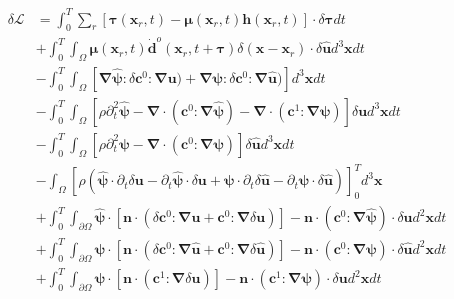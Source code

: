 \documentclass[extra,mreferee]{gji}
\newcommand{\bsy}[1]{\boldsymbol{{}#1}}
\begin{document}
\begin{equation}
	\begin{split}
		\delta\mathcal{L}
		&
		=\int^T_0\sum_{r}\left[\bsy{\tau}(\mathbf{x}_r,t)-\bsy{\mu}(\mathbf{x}_r,t)\mathbf{h}(\mathbf{x}_r,t)\right]\bsy{\cdot}\delta
		\bsy{\tau}dt \\
		& +\int^T_0\int_{\Omega}
		\bsy{\mu}(\mathbf{x}_r,t)\mathbf{\dot{d}}^o(\mathbf{x}_r,t+\bsy{\tau})\delta(\mathbf{x}-\mathbf{x}_r)\bsy{\cdot}\delta
		\mathbf{\hat{u}}d^3\mathbf{x}dt\\
		& -\int^T_0\int_{\Omega}\left[
		\bsy{\nabla\hat \psi:}\delta \bsy{\mathbf{c}}^0\bsy{:\nabla\mathbf{u}})
		+\bsy{\nabla\psi:}\delta \bsy{\mathbf{c}}^0\bsy{: \nabla\mathbf{\hat{u}}})\right]
		d^3\mathbf{x}dt\\
		& -\int^T_0\int_{\Omega} \left[\rho\partial^2_t \bsy{\hat \psi} -\bsy{\nabla
		\cdot}	(\bsy{\mathbf{c}}^0\bsy{:\nabla\bsy{\hat
		\psi}})-\bsy{\nabla\cdot}(\bsy{\mathbf{c}}^1\bsy{:\nabla\psi})
		\right]\delta\mathbf{u}d^3\mathbf{x}dt\\
	&-\int^T_0\int_{\Omega} \left[\rho\partial^2_t
	\bsy\psi-\bsy{\nabla\cdot}(\bsy{\mathbf{c}}^0\bsy{:\nabla\bsy\psi})\right]
	\delta\mathbf{\hat{u}}d^3\mathbf{x}dt\\
	&-\int_{\Omega} [\rho(\bsy{\hat \psi}
	\bsy{\cdot}\partial_t\delta\mathbf{u}-\partial_t\bsy{\hat \psi}\bsy{\cdot}\delta\mathbf{u}
	+\bsy{\psi}\bsy{\cdot}\partial_t\delta\mathbf{\hat{u}}-\partial_t
	\bsy{\psi}\bsy{\cdot}\delta\mathbf{\hat{u}})]^T_0d^3\mathbf{x}	\\
	&+\int^T_0\int_{\partial\Omega} \bsy{\hat
	\psi}\bsy{\cdot}[\mathbf{n}\bsy{\cdot}(\delta\mathbf{c}^0:\bsy{\nabla}\mathbf{u}+\mathbf{c}^0:\bsy{\nabla}\delta\mathbf{u})]
	-\mathbf{n}\bsy{\cdot}(\mathbf{c}^0:\bsy{\nabla}\bsy{\hat \psi})\bsy{\cdot}\delta\mathbf{u}d^2\mathbf{x}dt\\
	&+\int^T_0\int_{\partial\Omega} \bsy{
	\psi}\bsy{\cdot}[\mathbf{n}\bsy{\cdot}(\delta\mathbf{c}^0:\bsy{\nabla}\mathbf{\hat{u}}+\mathbf{c}^0:\bsy{\nabla}\delta\mathbf{\hat{u}})]
	-\mathbf{n}\bsy{\cdot}(\mathbf{c}^0:\bsy{\nabla}\bsy{\psi})\bsy{\cdot}\delta\mathbf{\hat{u}}d^2\mathbf{x}dt\\
	&+\int^T_0\int_{\partial\Omega} \bsy{
	\psi}\bsy{\cdot}[\mathbf{n}\bsy{\cdot}(\mathbf{c}^1:\bsy{\nabla}\delta\mathbf{u})]
	-\mathbf{n}\bsy{\cdot}(\mathbf{c}^1:\bsy{\nabla}\bsy{\psi})\bsy{\cdot}\delta\mathbf{u}d^2\mathbf{x}dt
	\end{split}
        \label{eq:DeltaLagrangian2}
\end{equation}
\end{document}
